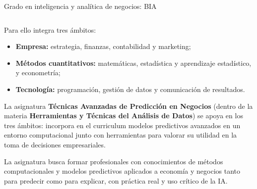 \documentclass[
  8pt,
  ignorenonframetext,
  aspectratio=169,
  spanish,
]{beamer}
\providecommand{\tightlist}{%
  \setlength{\itemsep}{0pt}\setlength{\parskip}{0pt}}
\begin{document}
\begin{frame}[shrink]{Grado en inteligencia y analítica de negocios:
BIA}
\begin{columns}[T]
\begin{column}{0.65\linewidth}
Para ello integra tres ámbitos:

\begin{itemize}
\tightlist
\item
  \textbf{Empresa:} estrategia, finanzas, contabilidad y marketing;
\item
  \textbf{Métodos cuantitativos:} matemáticas, estadística y aprendizaje
  estadístico, y econometría;
\item
  \textbf{Tecnología:} programación, gestión de datos y comunicación de
  resultados.
\end{itemize}

\begin{tcolorbox}[enhanced jigsaw, arc=.35mm, bottomtitle=1mm, colbacktitle=quarto-callout-note-color!10!white, breakable, toprule=.15mm, coltitle=black, colback=white, rightrule=.15mm, colframe=quarto-callout-note-color-frame, leftrule=.75mm, toptitle=1mm, opacitybacktitle=0.6, opacityback=0, title={Herramientas y Técnicas del Análisis de Datos}, titlerule=0mm, bottomrule=.15mm, left=2mm]

La asignatura \textbf{Técnicas Avanzadas de Predicción en Negocios}
(dentro de la materia \textbf{Herramientas y Técnicas del Análisis de
Datos}) se apoya en los tres ámbitos: incorpora en el curriculum modelos
predictivos avanzados en un entorno computacional junto con herramientas
para valorar su utilidad en la toma de decisiones empresariales.

La asignatura busca formar profesionales con conocimientos de métodos
computacionales y modelos predictivos aplicados a economía y negocios
tanto para predecir como para explicar, con práctica real y uso crítico
de la IA.

\end{tcolorbox}
\end{column}
\end{columns}

\end{frame}
\end{document}
